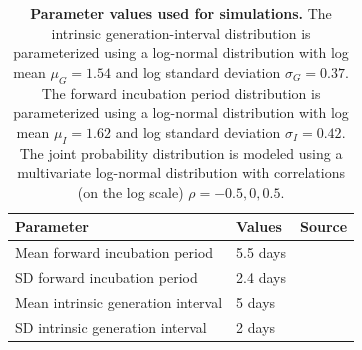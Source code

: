 \documentclass[12pt]{article}
\begin{document}
\begin{table}[!th]
\begin{center}
\begin{tabular}{|l|l|r|}
\hline
Parameter & Values & Source\\
\hline
Mean forward incubation period & 5.5 days & \cite{lauer2020incubation} \\
SD forward incubation period & 2.4 days & \cite{lauer2020incubation} \\
Mean intrinsic generation interval & 5 days & \cite{ferretti2020quantifying} \\
SD intrinsic generation interval & 2 days & \cite{ferretti2020quantifying} \\
\hline
\end{tabular}
\end{center}
\caption{
\textbf{Parameter values used for simulations.}
The intrinsic generation-interval distribution is parameterized using a log-normal distribution with log mean $\mu_G=1.54$ and log standard deviation $\sigma_G=0.37$.
The forward incubation period distribution is parameterized using a log-normal distribution with log mean $\mu_I=1.62$ and log standard deviation $\sigma_I=0.42$.
The joint probability distribution is modeled using a multivariate log-normal distribution with correlations (on the log scale) $\rho=-0.5, 0, 0.5$.
}
\end{table}
\end{document}
